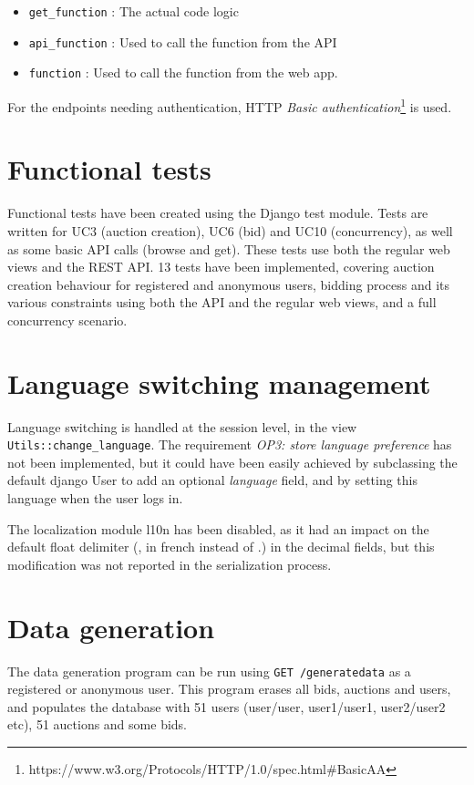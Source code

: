 \documentclass[a4paper, 11pt]{report}
\begin{document}
    \begin{itemize}
        \item \texttt{get\_function} : The actual code logic
        \item \texttt{api\_function} : Used to call the function from the API
        \item \texttt{function} : Used to call the function from the web app.
    \end{itemize}

    For the endpoints needing authentication, HTTP \textit{Basic authentication}\footnote{https://www.w3.org/Protocols/HTTP/1.0/spec.html\#BasicAA} is used. 

    \section{Functional tests}

    Functional tests have been created using the Django test module. Tests are written for UC3 (auction creation), UC6 (bid) and UC10 (concurrency), as well as some basic API calls (browse and get). These tests use both the regular web views and the REST API. 13 tests have been implemented, covering auction creation behaviour for registered and anonymous users, bidding process and its various constraints using both the API and the regular web views, and a full concurrency scenario. 

    \section{Language switching management}

    Language switching is handled at the session level, in the view \texttt{Utils::change\_language}. The requirement \textit{OP3: store language preference} has not been implemented, but it could have been easily achieved by subclassing the default django User to add an optional \textit{language} field, and by setting this language when the user logs in. 

    The localization module l10n has been disabled, as it had an impact on the default float delimiter (, in french instead of .) in the decimal fields, but this modification was not reported in the serialization process. 

    \section{Data generation}

    The data generation program can be run using \texttt{GET /generatedata} as a registered or anonymous user. This program erases all bids, auctions and users, and populates the database with 51 users (user/user, user1/user1, user2/user2 etc), 51 auctions and some bids. 
\end{document}
